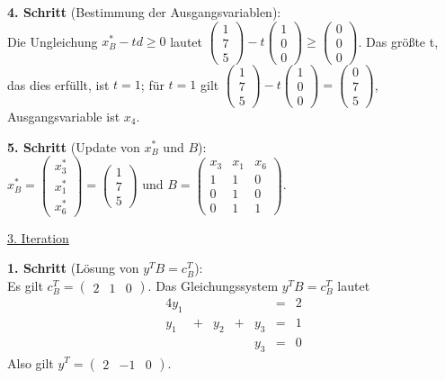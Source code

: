 \documentclass[10pt,a4paper,oneside,ngerman,numbers=noenddot]{scrartcl}
\begin{document}
		\textbf{4. Schritt} (Bestimmung der Ausgangsvariablen):\\
		Die Ungleichung $x_{B}^{*} - td \geq 0$ lautet $\begin{pmatrix} 1 \\ 7 \\ 5\end{pmatrix} - t \begin{pmatrix}1 \\ 0 \\ 0 \end{pmatrix} \geq \begin{pmatrix} 0 \\ 0 \\ 0 \end{pmatrix}$. Das größte t, das dies erfüllt, ist $t = 1$; für $t = 1$ gilt $\begin{pmatrix} 1 \\ 7 \\ 5\end{pmatrix} - t \begin{pmatrix}1 \\ 0 \\ 0 \end{pmatrix} = \begin{pmatrix} 0 \\ 7 \\ 5 \end{pmatrix}$, Ausgangsvariable ist $x_{4}$.
		
		\textbf{5. Schritt} (Update von $x_{B}^{*}$ und $B$):\\
		$x_{B}^{*} = \begin{pmatrix} x_{3}^{*} \\ x_{1}^{*} \\ x_{6}^{*} \end{pmatrix} = \begin{pmatrix} 1 \\ 7 \\ 5 \end{pmatrix}$ und $B = \begin{pmatrix} x_{3} & x_{1} & x_{6} \\ 1 & 1 & 0 \\ 0 & 1 & 0 \\ 0 & 1 & 1 \end{pmatrix}$.
		
		\underline{3. Iteration}
		
		\textbf{1. Schritt} (Lösung von $y^{T}B = c_{B}^{T}$):\\
		Es gilt $c_{B}^{T} = \begin{pmatrix} 2 & 1 & 0 \end{pmatrix}$. Das Gleichungssystem $y^{T}B = c_{B}^{T}$ lautet
		\begin{alignat*}{4}
			y_{1} && && &=& 2 \\
			y_{1} &+& y_{2} &+& y_{3} &=& 1 \\
			&& && y_{3} &=& 0
		\end{alignat*}
		Also gilt $y^{T} = \begin{pmatrix} 2 & -1 & 0 \end{pmatrix}$.
		
\end{document}
